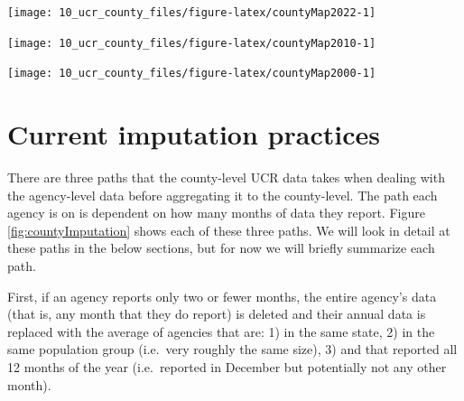 \documentclass[
]{krantz}
\let\origfigure\figure
\let\endorigfigure\endfigure
\renewenvironment{figure}[1][2] {
    \expandafter\origfigure\expandafter[H]
} {
    \endorigfigure
}
\begin{document}
\begin{figure}

{\centering \texttt{[image: 10\_ucr\_county\_files/figure-latex/countyMap2022-1]} 

}

\caption{The share of the population in each county covered by an agency reporting 12 months of data based on their last month reported being December, 2023.}\label{fig:countyMap2022}
\end{figure}

\begin{figure}

{\centering \texttt{[image: 10\_ucr\_county\_files/figure-latex/countyMap2010-1]} 

}

\caption{The share of the population in each county covered by an agency reporting 12 months of data based on their last month reported being December, 2010.}\label{fig:countyMap2010}
\end{figure}

\begin{figure}

{\centering \texttt{[image: 10\_ucr\_county\_files/figure-latex/countyMap2000-1]} 

}

\caption{The share of the population in each county covered by an agency reporting 12 months of data based on their last month reported being December, 2000.}\label{fig:countyMap2000}
\end{figure}

\section{Current imputation
practices}\label{current-imputation-practices}

There are three paths that the county-level UCR data takes
when dealing with the agency-level data before aggregating
it to the county-level. The path each agency is on is
dependent on how many months of data they report. Figure
\ref{fig:countyImputation} shows each of these three paths.
We will look in detail at these paths in the below sections,
but for now we will briefly summarize each path.

First, if an agency reports only two or fewer months, the
entire agency's data (that is, any month that they do
report) is deleted and their annual data is replaced with
the average of agencies that are: 1) in the same state, 2)
in the same population group (i.e.~very roughly the same
size), 3) and that reported all 12 months of the year
(i.e.~reported in December but potentially not any other
month).
\end{document}
